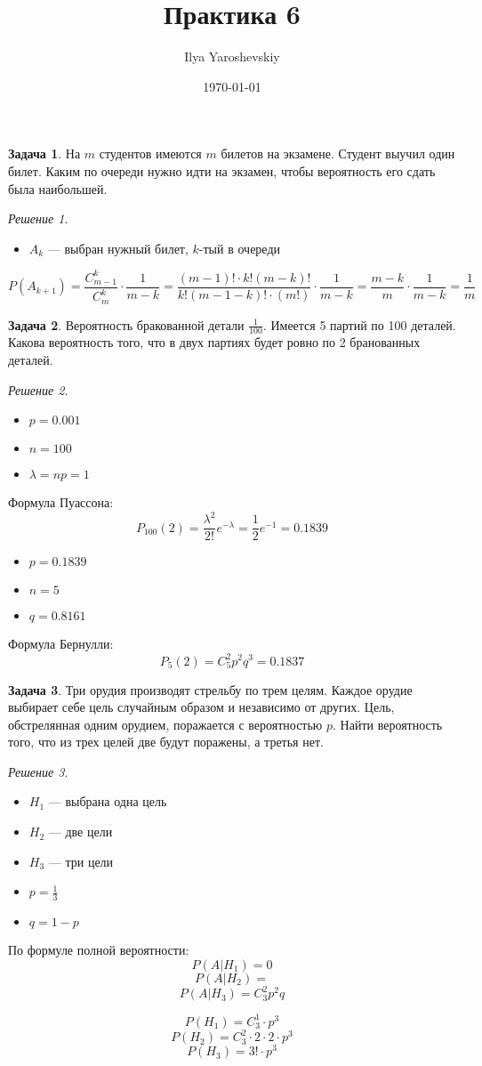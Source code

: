 \documentclass[english]{article}
\author{Ilya Yaroshevskiy}
\date{\today}
\title{Практика 6}
\theoremstyle{plain}
\theoremstyle{remark}
\newtheorem*{solution}{Решение}
\theoremstyle{definition}
\newtheorem{task}{Задача}
\begin{document}
\maketitle
\tableofcontents

\begin{task}
На \(m\) студентов имеются \(m\) билетов на экзамене. Студент выучил
один билет. Каким по очереди нужно идти на экзамен, чтобы вероятность
его сдать была наибольшей.
\end{task}
\begin{solution}
\-
\begin{itemize}
\item \(A_k\) --- выбран нужный билет, \(k\)-тый в очереди
\end{itemize}
\[ P(A_{k + 1}) = \frac{C^k_{m - 1}}{C^k_m}\cdot\frac{1}{m - k} = \frac{(m - 1)!\cdot k! (m - k)!}{k!(m - 1 - k)!\cdot(m!)} \cdot \frac{1}{m - k} = \frac{m - k}{m}\cdot\frac{1}{m - k} = \frac{1}{m}\]
\end{solution}

\begin{task}
Вероятность бракованной детали \(\frac{1}{100}\). Имеется 5 партий по
100 деталей. Какова вероятность того, что в двух партиях будет ровно
по 2 бранованных деталей.
\end{task}
\begin{solution}
\-
\begin{itemize}
\item \(p = 0.001\)
\item \(n = 100\)
\item \(\lambda = np = 1\)
\end{itemize}
Формула Пуассона:
\[ P_100(2) = \frac{\lambda^2}{2!}e^{-\lambda} = \frac{1}{2}e^{-1} = 0.1839 \]
\begin{itemize}
\item \(p = 0.1839\)
\item \(n = 5\)
\item \(q = 0.8161\)
\end{itemize}
Формула Бернулли:
\[ P_5(2) = C^2_5p^2q^3 = 0.1837 \]
\end{solution}
\begin{task}
Три орудия производят стрельбу по трем целям. Каждое орудие выбирает
себе цель случайным образом и независимо от других. Цель, обстрелянная
одним орудием, поражается с вероятностью \(p\). Найти вероятность
того, что из трех целей две будут поражены, а третья нет.
\end{task}
\begin{solution}
\-
\begin{itemize}
\item \(H_1\) --- выбрана одна цель
\item \(H_2\) --- две цели
\item \(H_3\) --- три цели
\item \(p = \frac{1}{3}\)
\item \(q = 1 - p\)
\end{itemize}
По формуле полной вероятности:
\[ P(A|H_1) =  0 \]
\[ P(A|H_2) =  \]
\[ P(A|H_3) = C^2_3 p^2 q \]

\[ P(H_1) = C^1_3 \cdot p^3 \]
\[ P(H_2) = C^2_3 \cdot2\cdot2 \cdot p^3 \]
\[ P(H_3) = 3! \cdot p^3 \]
\end{solution}
\end{document}
